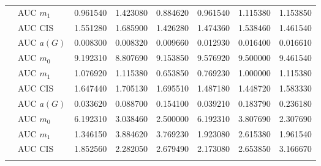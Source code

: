 \begin{table}[htbp]
\begin{tabular}{llrrrrrr}
    & AUC $m_1$ & 0.961540 & 1.423080 & 0.884620 & 0.961540 & 1.115380 & 1.153850 \\
    & AUC CIS & 1.551280 & 1.685900 & 1.426280 & 1.474360 & 1.538460 & 1.461540 \\
    \addlinespace
    \multirow{4}{*}{degree} & AUC $a(G)$ & 0.008300 & 0.008320 & 0.009660 & 0.012930 & 0.016400 & 0.016610 \\
    & AUC $m_0$ & 9.192310 & 8.807690 & 9.153850 & 9.576920 & 9.500000 & 9.461540 \\
    & AUC $m_1$ & 1.076920 & 1.115380 & 0.653850 & 0.769230 & 1.000000 & 1.115380 \\
    & AUC CIS & 1.647440 & 1.705130 & 1.695510 & 1.487180 & 1.448720 & 1.583330 \\
    \addlinespace
    \multirow{4}{*}{random} & AUC $a(G)$ & 0.033620 & 0.088700 & 0.154100 & 0.039210 & 0.183790 & 0.236180 \\
    & AUC $m_0$ & 6.192310 & 3.038460 & 2.500000 & 6.192310 & 3.807690 & 2.307690 \\
    & AUC $m_1$ & 1.346150 & 3.884620 & 3.769230 & 1.923080 & 2.615380 & 1.961540 \\
    & AUC CIS & 1.852560 & 2.282050 & 2.679490 & 2.173080 & 2.653850 & 3.166670 \\
    \addlinespace
    \bottomrule
  \end{tabular}
\end{table}

